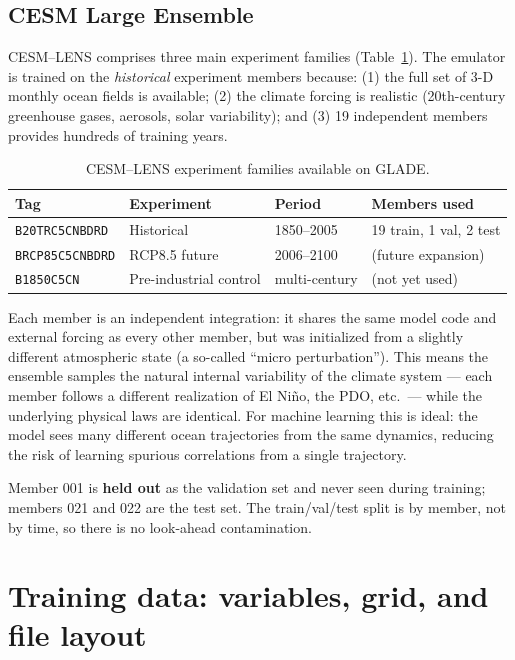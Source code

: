 \documentclass[11pt]{article}
\begin{document}
\subsection{CESM Large Ensemble}
CESM--LENS comprises three main experiment families (Table~\ref{tab:lens}). The
emulator is trained on the \emph{historical} experiment members because:
(1) the full set of 3-D monthly ocean fields is available;
(2) the climate forcing is realistic (20th-century greenhouse gases, aerosols,
solar variability); and
(3) 19 independent members provides hundreds of training years.

\begin{table}[h]
\centering
\caption{CESM--LENS experiment families available on GLADE.}
\label{tab:lens}
\begin{tabular}{llll}
\toprule
Tag & Experiment & Period & Members used \\
\midrule
\texttt{B20TRC5CNBDRD} & Historical & 1850--2005 & 19 train, 1 val, 2 test \\
\texttt{BRCP85C5CNBDRD} & RCP8.5 future & 2006--2100 & (future expansion) \\
\texttt{B1850C5CN} & Pre-industrial control & multi-century & (not yet used) \\
\bottomrule
\end{tabular}
\end{table}

Each member is an independent integration: it shares the same model code and
external forcing as every other member, but was initialized from a slightly
different atmospheric state (a so-called ``micro perturbation''). This means
the ensemble samples the natural internal variability of the climate system ---
each member follows a different realization of El Ni\~no, the PDO, etc.\ ---
while the underlying physical laws are identical. For machine learning this is
ideal: the model sees many different ocean trajectories from the same dynamics,
reducing the risk of learning spurious correlations from a single trajectory.

Member 001 is \textbf{held out} as the validation set and never seen during
training; members 021 and 022 are the test set. The train/val/test split is
by member, not by time, so there is no look-ahead contamination.

\section{Training data: variables, grid, and file layout}
\label{sec:data}
\end{document}
